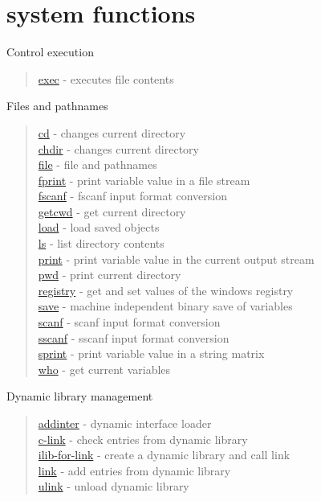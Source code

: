 \chapter*{system functions}

Control execution 
\begin{quote}
\noindent
\hyperlink{exec}{exec} - {executes file contents} \\ %
\end{quote}

Files and pathnames
\begin{quote}
\noindent
\hyperlink{cd}{cd} - {changes current directory} \\ %
\hyperlink{chdir}{chdir} - {changes current directory} \\ %
\hyperlink{file}{file} - file and pathnames\\
\hyperlink{fprint}{fprint} - print variable value in a file stream\\
\hyperlink{fscanf}{fscanf} - fscanf input format conversion \\
\hyperlink{getcwd}{getcwd} - {get current directory} \\
\hyperlink{load}{load} - load saved objects\\
\hyperlink{ls}{ls} - {list directory contents} \\ %
\hyperlink{print}{print} - print variable value  in the current output stream\\
\hyperlink{pwd}{pwd} - {print current directory} \\ %
\hyperlink{registry}{registry} - get and set values of the windows registry\\
\hyperlink{save}{save} - machine independent binary save of variables\\
\hyperlink{scanf}{scanf} - scanf input format conversion \\
\hyperlink{sscanf}{sscanf} - sscanf input format conversion \\
\hyperlink{sprint}{sprint} - print variable value in a string matrix \\
\hyperlink{who}{who} - get current variables\\
\end{quote}

Dynamic library management
\begin{quote}
\noindent 
\hyperlink{addinter}{addinter} - dynamic interface loader\\
\hyperlink{c_link}{c-link} - check entries from dynamic library \\
\hyperlink{ilib_for_link}{ilib-for-link} - create a dynamic library and call link \\
\hyperlink{link}{link} - add entries from dynamic library \\
\hyperlink{ulink}{ulink} - unload dynamic library \\
\end{quote}

